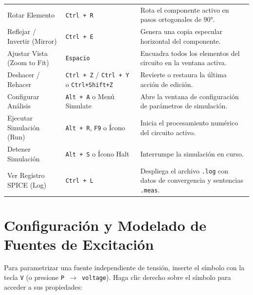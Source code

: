 \documentclass[11pt, a4paper]{article}
\begin{document}
\begin{table}[h!]
\begin{tabularx}{\textwidth}{@{} l l X @{}}
Rotar Elemento & \texttt{Ctrl + R} & Rota el componente activo en pasos ortogonales de 90°. \\
Reflejar / Invertir (Mirror) & \texttt{Ctrl + E} & Genera una copia especular horizontal del componente. \\
Ajustar Vista (Zoom to Fit) & \texttt{Espacio} & Encuadra todos los elementos del circuito en la ventana activa. \\
Deshacer / Rehacer & \texttt{Ctrl + Z} / \texttt{Ctrl + Y} o \texttt{Ctrl+Shift+Z} & Revierte o restaura la última acción de edición. \\
Configurar Análisis & \texttt{Alt + A} o Menú Simulate & Abre la ventana de configuración de parámetros de simulación. \\
Ejecutar Simulación (Run) & \texttt{Alt + R}, \texttt{F9} o Ícono & Inicia el procesamiento numérico del circuito activo. \\
Detener Simulación & \texttt{Alt + S} o Ícono Halt & Interrumpe la simulación en curso. \\
Ver Registro SPICE (Log) & \texttt{Ctrl + L} & Despliega el archivo \texttt{.log} con datos de convergencia y sentencias \texttt{.meas}. \\
\bottomrule
\end{tabularx}
\end{table}

\newpage
\section{Configuración y Modelado de Fuentes de Excitación}
Para parametrizar una fuente independiente de tensión, inserte el símbolo con la tecla \texttt{V} (o presione \texttt{P $\to$ voltage}). Haga clic derecho sobre el símbolo para acceder a sus propiedades:
\end{document}
